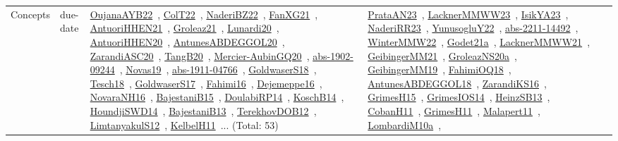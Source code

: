 {\begin{longtable}{lp{3cm}>{\raggedright\arraybackslash}p{6cm}>{\raggedright\arraybackslash}p{6cm}>{\raggedright\arraybackslash}p{8cm}}
Concepts & due-date & \href{works/OujanaAYB22.pdf}{OujanaAYB22}~\cite{OujanaAYB22}, \href{works/ColT22.pdf}{ColT22}~\cite{ColT22}, \href{works/NaderiBZ22.pdf}{NaderiBZ22}~\cite{NaderiBZ22}, \href{works/FanXG21.pdf}{FanXG21}~\cite{FanXG21}, \href{works/AntuoriHHEN21.pdf}{AntuoriHHEN21}~\cite{AntuoriHHEN21}, \href{works/Groleaz21.pdf}{Groleaz21}~\cite{Groleaz21}, \href{works/Lunardi20.pdf}{Lunardi20}~\cite{Lunardi20}, \href{works/AntuoriHHEN20.pdf}{AntuoriHHEN20}~\cite{AntuoriHHEN20}, \href{works/AntunesABDEGGOL20.pdf}{AntunesABDEGGOL20}~\cite{AntunesABDEGGOL20}, \href{works/ZarandiASC20.pdf}{ZarandiASC20}~\cite{ZarandiASC20}, \href{works/TangB20.pdf}{TangB20}~\cite{TangB20}, \href{works/Mercier-AubinGQ20.pdf}{Mercier-AubinGQ20}~\cite{Mercier-AubinGQ20}, \href{works/abs-1902-09244.pdf}{abs-1902-09244}~\cite{abs-1902-09244}, \href{works/Novas19.pdf}{Novas19}~\cite{Novas19}, \href{works/abs-1911-04766.pdf}{abs-1911-04766}~\cite{abs-1911-04766}, \href{works/GoldwaserS18.pdf}{GoldwaserS18}~\cite{GoldwaserS18}, \href{works/Tesch18.pdf}{Tesch18}~\cite{Tesch18}, \href{works/GoldwaserS17.pdf}{GoldwaserS17}~\cite{GoldwaserS17}, \href{works/Fahimi16.pdf}{Fahimi16}~\cite{Fahimi16}, \href{works/Dejemeppe16.pdf}{Dejemeppe16}~\cite{Dejemeppe16}, \href{works/NovaraNH16.pdf}{NovaraNH16}~\cite{NovaraNH16}, \href{works/BajestaniB15.pdf}{BajestaniB15}~\cite{BajestaniB15}, \href{works/DoulabiRP14.pdf}{DoulabiRP14}~\cite{DoulabiRP14}, \href{works/KoschB14.pdf}{KoschB14}~\cite{KoschB14}, \href{works/HoundjiSWD14.pdf}{HoundjiSWD14}~\cite{HoundjiSWD14}, \href{works/BajestaniB13.pdf}{BajestaniB13}~\cite{BajestaniB13}, \href{works/TerekhovDOB12.pdf}{TerekhovDOB12}~\cite{TerekhovDOB12}, \href{works/LimtanyakulS12.pdf}{LimtanyakulS12}~\cite{LimtanyakulS12}, \href{works/KelbelH11.pdf}{KelbelH11}~\cite{KelbelH11}... (Total: 53) & \href{works/PrataAN23.pdf}{PrataAN23}~\cite{PrataAN23}, \href{works/LacknerMMWW23.pdf}{LacknerMMWW23}~\cite{LacknerMMWW23}, \href{works/IsikYA23.pdf}{IsikYA23}~\cite{IsikYA23}, \href{works/NaderiRR23.pdf}{NaderiRR23}~\cite{NaderiRR23}, \href{works/YunusogluY22.pdf}{YunusogluY22}~\cite{YunusogluY22}, \href{works/abs-2211-14492.pdf}{abs-2211-14492}~\cite{abs-2211-14492}, \href{works/WinterMMW22.pdf}{WinterMMW22}~\cite{WinterMMW22}, \href{works/Godet21a.pdf}{Godet21a}~\cite{Godet21a}, \href{works/LacknerMMWW21.pdf}{LacknerMMWW21}~\cite{LacknerMMWW21}, \href{works/GeibingerMM21.pdf}{GeibingerMM21}~\cite{GeibingerMM21}, \href{works/GroleazNS20a.pdf}{GroleazNS20a}~\cite{GroleazNS20a}, \href{works/GeibingerMM19.pdf}{GeibingerMM19}~\cite{GeibingerMM19}, \href{works/FahimiOQ18.pdf}{FahimiOQ18}~\cite{FahimiOQ18}, \href{works/AntunesABDEGGOL18.pdf}{AntunesABDEGGOL18}~\cite{AntunesABDEGGOL18}, \href{works/ZarandiKS16.pdf}{ZarandiKS16}~\cite{ZarandiKS16}, \href{works/GrimesH15.pdf}{GrimesH15}~\cite{GrimesH15}, \href{works/GrimesIOS14.pdf}{GrimesIOS14}~\cite{GrimesIOS14}, \href{works/HeinzSB13.pdf}{HeinzSB13}~\cite{HeinzSB13}, \href{works/CobanH11.pdf}{CobanH11}~\cite{CobanH11}, \href{works/GrimesH11.pdf}{GrimesH11}~\cite{GrimesH11}, \href{works/Malapert11.pdf}{Malapert11}~\cite{Malapert11}, \href{works/LombardiM10a.pdf}{LombardiM10a}~\cite{LombardiM10a}, 
\end{longtable}}
